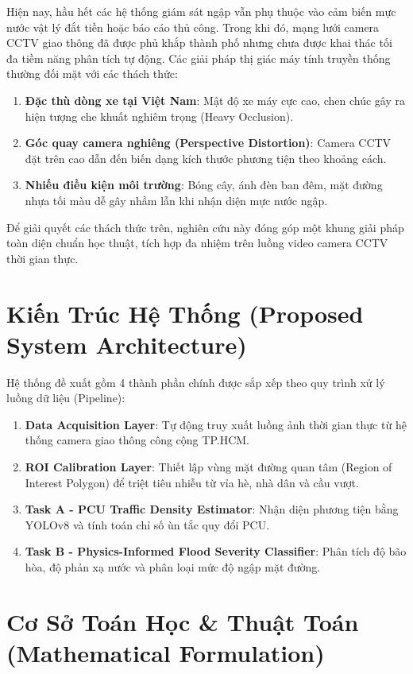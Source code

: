\documentclass[conference]{IEEEtran}
\begin{document}
Hiện nay, hầu hết các hệ thống giám sát ngập vẫn phụ thuộc vào cảm biến mực nước vật lý đắt tiền hoặc báo cáo thủ công. Trong khi đó, mạng lưới camera CCTV giao thông đã được phủ khắp thành phố nhưng chưa được khai thác tối đa tiềm năng phân tích tự động. Các giải pháp thị giác máy tính truyền thống thường đối mặt với các thách thức:
\begin{enumerate}
    \item \textbf{Đặc thù dòng xe tại Việt Nam}: Mật độ xe máy cực cao, chen chúc gây ra hiện tượng che khuất nghiêm trọng (Heavy Occlusion).
    \item \textbf{Góc quay camera nghiêng (Perspective Distortion)}: Camera CCTV đặt trên cao dẫn đến biến dạng kích thước phương tiện theo khoảng cách.
    \item \textbf{Nhiếu điều kiện môi trường}: Bóng cây, ánh đèn ban đêm, mặt đường nhựa tối màu dễ gây nhầm lẫn khi nhận diện mực nước ngập.
\end{enumerate}

Để giải quyết các thách thức trên, nghiên cứu này đóng góp một khung giải pháp toàn diện chuẩn học thuật, tích hợp đa nhiệm trên luồng video camera CCTV thời gian thực.

\section{Kiến Trúc Hệ Thống (Proposed System Architecture)}
Hệ thống đề xuất gồm 4 thành phần chính được sắp xếp theo quy trình xử lý luồng dữ liệu (Pipeline):

\begin{enumerate}
    \item \textbf{Data Acquisition Layer}: Tự động truy xuất luồng ảnh thời gian thực từ hệ thống camera giao thông công cộng TP.HCM.
    \item \textbf{ROI Calibration Layer}: Thiết lập vùng mặt đường quan tâm (Region of Interest Polygon) để triệt tiêu nhiễu từ vỉa hè, nhà dân và cầu vượt.
    \item \textbf{Task A - PCU Traffic Density Estimator}: Nhận diện phương tiện bằng YOLOv8 và tính toán chỉ số ùn tắc quy đổi PCU.
    \item \textbf{Task B - Physics-Informed Flood Severity Classifier}: Phân tích độ bão hòa, độ phản xạ nước và phân loại mức độ ngập mặt đường.
\end{enumerate}

\section{Cơ Sở Toán Học \& Thuật Toán (Mathematical Formulation)}
\end{document}
